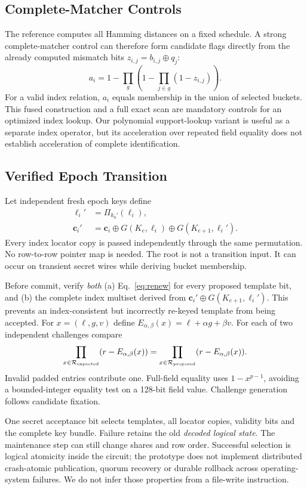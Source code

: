 \documentclass[journal]{IEEEtran}
\begin{document}
\subsection{Complete-Matcher Controls}\label{sec:matcher}
The reference computes all Hamming distances on a fixed schedule. A strong complete-matcher control can therefore form candidate flags directly from the already computed mismatch bits $z_{i,j}=b_{i,j}\oplus q_j$:
\[
a_i=1-\prod_g\left(1-\prod_{j\in g}(1-z_{i,j})\right).
\]
For a valid index relation, $a_i$ equals membership in the union of selected buckets. This fused construction and a full exact scan are mandatory controls for an optimized index lookup. Our polynomial support-lookup variant is useful as a separate index operator, but its acceleration over repeated field equality does not establish acceleration of complete identification.

\subsection{Verified Epoch Transition}\label{sec:transition}
Let independent fresh epoch keys define
\begin{align}
\ell_i'&=\Pi_{k_0'}(\ell_i),\\
\mathbf c_i'&=\mathbf c_i\oplus G(K_e,\ell_i)\oplus G(K_{e+1},\ell_i').\label{eq:renew}
\end{align}
Every index locator copy is passed independently through the same permutation. No row-to-row pointer map is needed. The root is not a transition input. It can occur on transient secret wires while deriving bucket membership.

Before commit, verify \emph{both} (a) Eq.~\eqref{eq:renew} for every proposed template bit, and (b) the complete index multiset derived from $\mathbf c_i'\oplus G(K_{e+1},\ell_i')$. This prevents an index-consistent but incorrectly re-keyed template from being accepted. For $x=(\ell,g,v)$ define $E_{\alpha,\beta}(x)=\ell+\alpha g+\beta v$. For each of two independent challenges compare
\begin{equation}
\prod_{x\in\mathcal R_{\rm expected}}(r-E_{\alpha,\beta}(x))
=\prod_{x\in\mathcal R_{\rm proposed}}(r-E_{\alpha,\beta}(x)).
\end{equation}
Invalid padded entries contribute one. Full-field equality uses $1-x^{p-1}$, avoiding a bounded-integer equality test on a 128-bit field value. Challenge generation follows candidate fixation.

One secret acceptance bit selects templates, all locator copies, validity bits and the complete key bundle. Failure retains the old \emph{decoded logical state}. The maintenance step can still change shares and row order. Successful selection is logical atomicity inside the circuit; the prototype does not implement distributed crash-atomic publication, quorum recovery or durable rollback across operating-system failures. We do not infer those properties from a file-write instruction.
\end{document}
